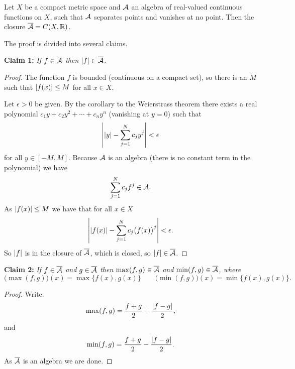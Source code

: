 \begin{thm}
\label{thm:SWreal}
Let $X$ be a compact metric space and ${\mathcal{A}}$ an algebra of real-valued
continuous functions on $X$, such that ${\mathcal{A}}$ separates points and vanishes at
no point.  Then the closure $\overline{{\mathcal{A}}} = C(X,{\mathbb{R}})$.
\end{thm}

The proof is divided into several claims.

\medskip

\noindent
\textbf{Claim 1:} \emph{If $f \in \overline{{\mathcal{A}}}$ then $\lvert {f} \rvert \in
\overline{{\mathcal{A}}}$.}

\begin{proof}
The function $f$ is bounded (continuous on a compact set), so there is an $M$
such that $\lvert {f(x)} \rvert \leq M$ for all $x \in X$.

Let $\epsilon > 0$ be given.  By the corollary to the Weierstrass theorem there
exists a real polynomial $c_1 y + c_2 y^2 + \cdots+ c_n y^n$ (vanishing at
$y=0$) such that
\begin{equation*}
\left\lvert {\lvert {y} \rvert - \sum_{j=1}^N c_j y^j} \right\rvert < \epsilon
\end{equation*}
for all $y \in [-M,M]$.
Because ${\mathcal{A}}$ is an algebra (there is no constant term in the polynomial)
we have
\begin{equation*}
\sum_{j=1}^N c_j f^j \in {\mathcal{A}} .
\end{equation*}
As $\lvert {f(x)} \rvert \leq M$ we have that for all $x \in X$
\begin{equation*}
\left\lvert {\lvert {f(x)} \rvert - \sum_{j=1}^N c_j {\bigl(f(x)\bigr)}^j} \right\rvert
< \epsilon .
\end{equation*}
So $\lvert {f} \rvert$ is in the closure of $\overline{{\mathcal{A}}}$, which is closed, so $\lvert {f} \rvert \in
\overline{{\mathcal{A}}}$.
\end{proof}

\medskip

\noindent
\textbf{Claim 2:} \emph{If $f \in \overline{{\mathcal{A}}}$ and $g \in \overline{{\mathcal{A}}}$ then
$\max(f,g) \in \overline{{\mathcal{A}}}$ and
$\min(f,g) \in \overline{{\mathcal{A}}}$, where
}
\begin{equation*}
\bigl(\max(f,g)\bigr) (x) = \max \{ f(x), g(x) \} \qquad
\bigl(\min(f,g)\bigr) (x) = \min \{ f(x), g(x) \} .
\end{equation*}

\begin{proof}
Write:
\begin{equation*}
\max(f,g) = \frac{f+g}{2} + \frac{\lvert {f-g} \rvert}{2} ,
\end{equation*}
and
\begin{equation*}
\min(f,g) = \frac{f+g}{2} - \frac{\lvert {f-g} \rvert}{2} .
\end{equation*}
As $\overline{{\mathcal{A}}}$ is an algebra we are done.
\end{proof}

